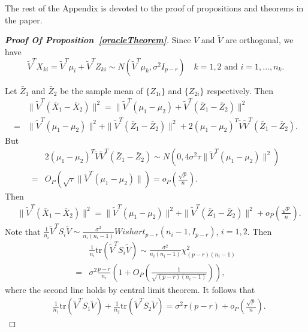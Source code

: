 \documentclass[review]{elsarticle}
\theoremstyle{plain}
\theoremstyle{definition}
\theoremstyle{remark}
\begin{document}
The rest of the Appendix is devoted to the proof of propositions and theorems in the paper.
\begin{proof}[\textbf{Proof Of Proposition~\ref{oracleTheorem}}]
Since $V$ and $\tilde{V}$ are orthogonal, we have
    $$\tilde{V}^T X_{ki}=\tilde{V}^T\mu_i+ \tilde{V}^T Z_{ki}\sim N(\tilde{V}^T\mu_k,\sigma^2 I_{p-r})\quad \textrm{$k=1,2$ and $i=1,\ldots,n_k$}.$$
    

    Let $\bar{Z}_1$ and $\bar{Z}_2$ be the sample mean of $\{Z_{1i}\}$ and $\{Z_{2i}\}$ respectively. Then
    \begin{equation*}
        \begin{aligned}
            &\|\tilde{V}^T(\bar{X}_1-\bar{X}_2)\|^2
            =\|\tilde{V}^T(\mu_1-\mu_2)+\tilde{V}^T(\bar{Z}_1-\bar{Z}_2)\|^2\\
            =&\|\tilde{V}^T(\mu_1-\mu_2)\|^2+\|\tilde{V}^T(\bar{Z}_1-\bar{Z}_2)\|^2+
            2{(\mu_1-\mu_2)}^T\tilde{V}\tilde{V}^T(\bar{Z}_1-\bar{Z}_2).
        \end{aligned}
    \end{equation*}
But
    \begin{equation*}
        \begin{aligned}
            &2{(\mu_1-\mu_2)}^T\tilde{V}\tilde{V}^T(\bar{Z}_1-\bar{Z}_2)\sim N(0,4\sigma^2 \tau \|\tilde{V}^T(\mu_1-\mu_2)\|^2)\\
            =& O_P(\sqrt{\tau}\|\tilde{V}^T(\mu_1-\mu_2)\| )=o_P(\frac{\sqrt{p}}{n}).
        \end{aligned}
    \end{equation*}
    Then
    \begin{equation}\label{prop1eq1}
        \begin{aligned}
            &\|\tilde{V}^T(\bar{X}_1-\bar{X}_2)\|^2
            =\|\tilde{V}^T(\mu_1-\mu_2)\|^2+\|\tilde{V}^T(\bar{Z}_1-\bar{Z}_2)\|^2+
            o_P(\frac{\sqrt{p}}{n}).
        \end{aligned}
    \end{equation}
    Note that
    $
    \frac{1}{n_i} \tilde{V}^T S_i \tilde{V}\sim
    \frac{\sigma^2}{n_i(n_i-1)}Wishart_{p-r}(n_i-1,I_{p-r})
    $, $i=1,2$.
    Then 
    \begin{equation*}
        \begin{aligned}
            &\frac{1}{n_i} \mathrm{tr}(\tilde{V}^T S_i \tilde{V})\sim \frac{\sigma^2}{n_i(n_i-1)}\chi^2_{(p-r)(n_i-1)}\\
            =&
            \sigma^2\frac{p-r}{n_i}(1+O_P(\frac{1}{\sqrt{(p-r)(n_i-1)}})),
        \end{aligned}
    \end{equation*}
    where the second line holds by central limit theorem. It follows that
    \begin{equation}\label{prop1eq2}
        \begin{aligned}
            &\frac{1}{n_1} \mathrm{tr}(\tilde{V}^T S_1 \tilde{V})+
            \frac{1}{n_2} \mathrm{tr}(\tilde{V}^T S_2 \tilde{V})=\sigma^2 \tau (p-r)+o_P(\frac{\sqrt{p}}{n}).
        \end{aligned}
    \end{equation}


\end{proof}
\end{document}
